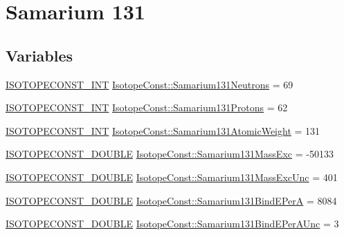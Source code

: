 \hypertarget{group___isotope_const-_samarium-_sm131}{}\section{Samarium 131}
\label{group___isotope_const-_samarium-_sm131}
\subsection*{Variables}
\begin{DoxyCompactItemize}
\item 
\mbox{\hyperlink{group___isotope_const-_macros_ga5f18360b3e99483a35c32d789e62621c}{I\+S\+O\+T\+O\+P\+E\+C\+O\+N\+S\+T\+\_\+\+I\+NT}} \mbox{\hyperlink{group___isotope_const-_samarium-_sm131_ga23dbef5607ed2a656c8a9b9c4db8d2b5}{Isotope\+Const\+::\+Samarium131\+Neutrons}} = 69
\item 
\mbox{\hyperlink{group___isotope_const-_macros_ga5f18360b3e99483a35c32d789e62621c}{I\+S\+O\+T\+O\+P\+E\+C\+O\+N\+S\+T\+\_\+\+I\+NT}} \mbox{\hyperlink{group___isotope_const-_samarium-_sm131_ga77935bad885bb336cda28b7a64d50680}{Isotope\+Const\+::\+Samarium131\+Protons}} = 62
\item 
\mbox{\hyperlink{group___isotope_const-_macros_ga5f18360b3e99483a35c32d789e62621c}{I\+S\+O\+T\+O\+P\+E\+C\+O\+N\+S\+T\+\_\+\+I\+NT}} \mbox{\hyperlink{group___isotope_const-_samarium-_sm131_ga9019eadc3ca02704e42c0a1b1f5d15e1}{Isotope\+Const\+::\+Samarium131\+Atomic\+Weight}} = 131
\item 
\mbox{\hyperlink{group___isotope_const-_macros_ga8f45a7272ce02c0b4c65c44636ed719a}{I\+S\+O\+T\+O\+P\+E\+C\+O\+N\+S\+T\+\_\+\+D\+O\+U\+B\+LE}} \mbox{\hyperlink{group___isotope_const-_samarium-_sm131_gad113e23c1aacf0f70cefcd386c18e5af}{Isotope\+Const\+::\+Samarium131\+Mass\+Exc}} = -\/50133
\item 
\mbox{\hyperlink{group___isotope_const-_macros_ga8f45a7272ce02c0b4c65c44636ed719a}{I\+S\+O\+T\+O\+P\+E\+C\+O\+N\+S\+T\+\_\+\+D\+O\+U\+B\+LE}} \mbox{\hyperlink{group___isotope_const-_samarium-_sm131_ga02f5b148d0b1ee740a6dbab57c02b6b0}{Isotope\+Const\+::\+Samarium131\+Mass\+Exc\+Unc}} = 401
\item 
\mbox{\hyperlink{group___isotope_const-_macros_ga8f45a7272ce02c0b4c65c44636ed719a}{I\+S\+O\+T\+O\+P\+E\+C\+O\+N\+S\+T\+\_\+\+D\+O\+U\+B\+LE}} \mbox{\hyperlink{group___isotope_const-_samarium-_sm131_gab891cfe9ed0e562a04291e3f3e443ae3}{Isotope\+Const\+::\+Samarium131\+Bind\+E\+PerA}} = 8084
\item 
\mbox{\hyperlink{group___isotope_const-_macros_ga8f45a7272ce02c0b4c65c44636ed719a}{I\+S\+O\+T\+O\+P\+E\+C\+O\+N\+S\+T\+\_\+\+D\+O\+U\+B\+LE}} \mbox{\hyperlink{group___isotope_const-_samarium-_sm131_ga67a587b75a3dadbef377f4fd43627b92}{Isotope\+Const\+::\+Samarium131\+Bind\+E\+Per\+A\+Unc}} = 3

\end{DoxyCompactItemize}

